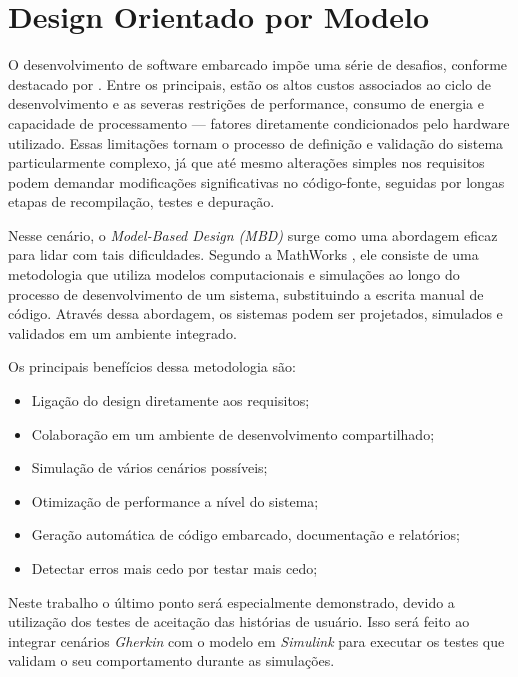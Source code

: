 
\section{\textbf{Design Orientado por Modelo}}
O desenvolvimento de software embarcado impõe uma série de desafios, conforme destacado por . Entre os principais, estão os altos custos associados 
ao ciclo de desenvolvimento e as severas restrições de performance, consumo de energia e capacidade de processamento — fatores diretamente condicionados pelo 
hardware utilizado. Essas limitações tornam o processo de definição e validação do sistema particularmente complexo, já que até mesmo alterações simples nos 
requisitos podem demandar modificações significativas no código-fonte, seguidas por longas etapas de recompilação, testes e depuração.

Nesse cenário, o \textit{Model-Based Design (MBD)} surge como uma abordagem eficaz para lidar com tais dificuldades. Segundo a MathWorks \cite{mathworksMBD2024}, ele 
consiste de uma metodologia que utiliza modelos computacionais e simulações ao longo do processo de desenvolvimento de um sistema, substituindo a escrita manual 
de código. Através dessa abordagem, os sistemas podem ser projetados, simulados e validados em um ambiente integrado.

Os principais benefícios dessa metodologia são:

\begin{itemize}
	\item Ligação do design diretamente aos requisitos;
	\item Colaboração em um ambiente de desenvolvimento compartilhado;
	\item Simulação de vários cenários possíveis;
	\item Otimização de performance a nível do sistema;
	\item Geração automática de código embarcado, documentação e relatórios;
	\item Detectar erros mais cedo por testar mais cedo;
\end{itemize}

Neste trabalho o último ponto será especialmente demonstrado, devido a utilização dos testes de aceitação das histórias de usuário. Isso será feito ao integrar 
cenários \textit{Gherkin} com o modelo em \textit{Simulink} para executar os testes que validam o seu comportamento durante as simulações.

